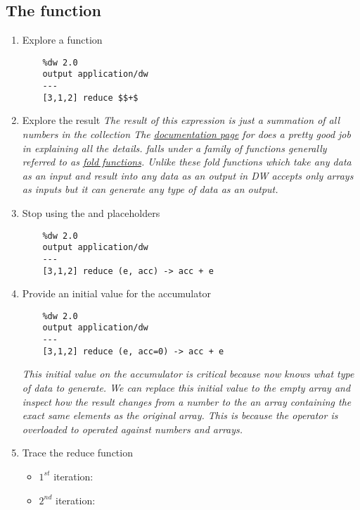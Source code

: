 \subsection{The  function}
\begin{enumerate}[resume*]
\item Explore a  function
  \begin{verbatim}
    %dw 2.0
    output application/dw
    ---
    [3,1,2] reduce $$+$
  \end{verbatim}
\item Explore the result
  \newline
  \emph{
    The result of this expression is just a summation of all numbers in the collection
    \newline
    The \href{https://docs.mulesoft.com/mule-runtime/4.3/dw-core-functions-reduce}{documentation page} for  does a pretty good job in explaining all the details.
    \newline
     falls under a family of functions generally referred to as \href{https://en.wikipedia.org/wiki/Fold_(higher-order_function)}{fold functions}.  Unlike these fold functions which take any data as an input and result into any data as an output  in DW accepts only arrays as inputs but it can generate any type of data as an output.
  }
\item Stop using the \ttt{\$} and \ttt{\$\$} placeholders
  \begin{verbatim}
    %dw 2.0
    output application/dw
    ---
    [3,1,2] reduce (e, acc) -> acc + e    
  \end{verbatim}
\item Provide an initial value for the accumulator
  \begin{verbatim}
    %dw 2.0
    output application/dw
    ---
    [3,1,2] reduce (e, acc=0) -> acc + e
  \end{verbatim}
  \emph{
    This initial value on the accumulator is critical because now  knows what type of data to generate.  We can replace this initial value to the empty array and inspect how the result changes from a number to the an array containing the exact same elements as the original array.  This is because the \ttt{+} operator is overloaded to operated against numbers and arrays.
  }
\item Trace the reduce function
  \begin{itemize}
  \item $1^{st}$ iteration: 
  \item $2^{nd}$ iteration: 

\end{itemize}
\end{enumerate}
